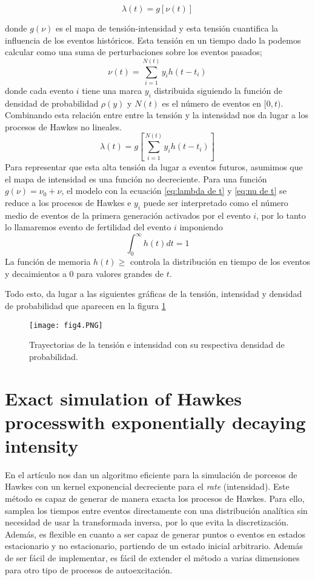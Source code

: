 \documentclass[a4paper,11pt]{book}
\begin{document}
\begin{equation}
    \lambda(t)=g[\nu(t)]
    \label{eq:lambda de t}
\end{equation}


donde $g(\nu)$ es el mapa de tensión-intensidad y esta tensión cuantifica la influencia de los eventos históricos. Esta tensión en un tiempo dado la podemos 
calcular como una suma de perturbaciones sobre los eventos pasados; 
\begin{equation}
    \nu(t)=\sum_{i=1}^{N(t)}y_ih(t-t_i)
    \label{eq:nu de t}
\end{equation}
donde cada evento $i$ tiene una marca $y_i$ distribuida siguiendo la función de densidad de probabilidad $\rho(y)$ y $N(t)$ es el número de eventos en $[0,t)$.
Combinando esta relación entre entre la tensión y la intensidad nos da lugar a los procesos de Hawkes no lineales.
$$\lambda(t)=g\left[ \sum_{i=1}^{N(t)} y_ih(t-t_i)\right]$$
Para representar que esta alta tensión da lugar a eventos futuros, asumimos que el mapa de intensidad es una función no decreciente. Para una función 
$g(\nu)=\nu_0+\nu$, el modelo con la ecuación \ref{eq:lambda de t} y \ref{eq:nu de t} se reduce a los procesos de Hawkes e $y_i$ puede ser interpretado como 
el número medio de eventos de la primera generación activados por el evento $i$, por lo tanto lo llamaremos evento de fertilidad del evento $i$ imponiendo 
$$\int_{0}^{\infty}h(t)dt=1$$
La función de memoria $h(t)\geq$ controla la distribución en tiempo de los eventos y decaimientos a 0 para valores grandes de $t$.

Todo esto, da lugar a las siguientes gráficas de la tensión, intensidad y densidad de probabilidad que aparecen en la figura \ref{f:f4}

\begin{figure}[H]
\centering
\texttt{[image: fig4.PNG]}
\caption{Trayectorias de la tensión e intensidad con su respectiva densidad de probabilidad.}
\label{f:f4}    
\end{figure}

\chapter{Exact simulation of Hawkes processwith exponentially decaying intensity}
En el artículo nos dan un algoritmo eficiente para la simulación de porcesos de Hawkes con un kernel exponencial decreciente para el \textit{rate} (intensidad).
Este método es capaz de generar de manera exacta los procesos de Hawkes. Para ello, samplea los tiempos entre eventos directamente con una distribución 
analítica sin necesidad de usar la transformada inversa, por lo que evita la discretización. Además, es flexible en cuanto a ser capaz de generar puntos o 
eventos en estados estacionario y no estacionario, partiendo de un estado inicial arbitrario. Además de ser fácil de implementar, es fácil de extender 
el método a varias dimensiones para otro tipo de procesos de autoexcitación.
\end{document}
